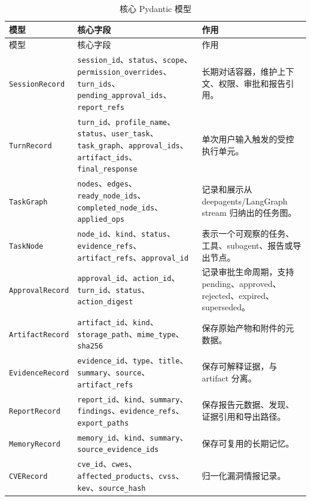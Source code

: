 \documentclass[UTF8,zihao=-4,a4paper,fontset=none]{ctexart}
\newcommand{\code}[1]{\texttt{\footnotesize #1}}
\begin{document}
\begin{longtable}{L{0.22\textwidth}L{0.33\textwidth}L{0.35\textwidth}}
\caption{核心 Pydantic 模型}\label{tab:models}\\
\toprule
模型 & 核心字段 & 作用 \\
\midrule
\endfirsthead
\toprule
模型 & 核心字段 & 作用 \\
\midrule
\endhead
\code{SessionRecord} & \code{session\_id}、\code{status}、\code{scope}、\code{permission\_overrides}、\code{turn\_ids}、\code{pending\_approval\_ids}、\code{report\_refs} & 长期对话容器，维护上下文、权限、审批和报告引用。 \\
\code{TurnRecord} & \code{turn\_id}、\code{profile\_name}、\code{status}、\code{user\_task}、\code{task\_graph}、\code{approval\_ids}、\code{artifact\_ids}、\code{final\_response} & 单次用户输入触发的受控执行单元。 \\
\code{TaskGraph} & \code{nodes}、\code{edges}、\code{ready\_node\_ids}、\code{completed\_node\_ids}、\code{applied\_ops} & 记录和展示从 deepagents/LangGraph stream 归纳出的任务图。 \\
\code{TaskNode} & \code{node\_id}、\code{kind}、\code{status}、\code{evidence\_refs}、\code{artifact\_refs}、\code{approval\_id} & 表示一个可观察的任务、工具、subagent、报告或导出节点。 \\
\code{ApprovalRecord} & \code{approval\_id}、\code{action\_id}、\code{turn\_id}、\code{status}、\code{action\_digest} & 记录审批生命周期，支持 pending、approved、rejected、expired、superseded。 \\
\code{ArtifactRecord} & \code{artifact\_id}、\code{kind}、\code{storage\_path}、\code{mime\_type}、\code{sha256} & 保存原始产物和附件的元数据。 \\
\code{EvidenceRecord} & \code{evidence\_id}、\code{type}、\code{title}、\code{summary}、\code{source}、\code{artifact\_refs} & 保存可解释证据，与 artifact 分离。 \\
\code{ReportRecord} & \code{report\_id}、\code{kind}、\code{summary}、\code{findings}、\code{evidence\_refs}、\code{export\_paths} & 保存报告元数据、发现、证据引用和导出路径。 \\
\code{MemoryRecord} & \code{memory\_id}、\code{kind}、\code{summary}、\code{source\_evidence\_ids} & 保存可复用的长期记忆。 \\
\code{CVERecord} & \code{cve\_id}、\code{cwes}、\code{affected\_products}、\code{cvss}、\code{kev}、\code{source\_hash} & 归一化漏洞情报记录。 \\
\bottomrule
\end{longtable}
\end{document}
